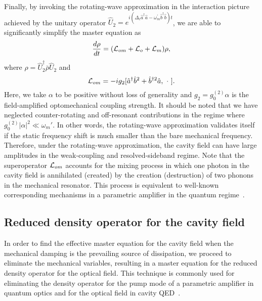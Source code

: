 \documentclass[pra,aps,showpacs,twocolumn,floatfix, superscriptaddress, nofootinbib, nobibnotes]{revtex4-1}
\begin{document}
Finally, by invoking the rotating-wave approximation in the interaction picture achieved by the unitary operator $\hat U_2 = e^{i(\Delta_c\hat a^\dag\hat a-\omega_m^\prime\hat b^\dag\hat b)t}$, we are able to significantly simplify the master equation as
\begin{equation}
\frac{d\rho}{dt} = ({\cal L}_{om}+{\cal L}_o+{\cal L}_m)\rho, \label{master}
\end{equation}
where $\rho = \hat U_2^{\dag}\bar\rho\hat U_2$ and 
\begin{equation}
 {\cal L}_{om} =- ig_2[\hat a^\dag\hat b^2+\hat b^{\dag 2}\hat a,~\cdot~].
\end{equation}
Here, we take $\alpha$ to be positive without loss of generality and $g_2=g_0^{(2)}\alpha$ is the field-amplified optomechanical coupling strength. It should be noted that we have neglected counter-rotating and off-resonant contributions in the regime where $g_0^{(2)}|\alpha|^2 \ll \omega_m'$. In other words, the rotating-wave approximation validates itself if the static frequency shift is much smaller than the bare mechanical frequency. Therefore, under the rotating-wave approximation, the cavity field can have large amplitudes in the weak-coupling and resolved-sideband regime.
Note that the superoperator ${\cal L}_{om}$ accounts for the mixing process in which one photon in the cavity field is annihilated (created) by the creation (destruction) of two phonons in the mechanical resonator. This process is equivalent to well-known corresponding mechanisms in a parametric amplifier in the quantum regime~\cite{Milburn_book_1}.

\subsection{Reduced density operator for the cavity field}
In order to find the effective master equation for the cavity field when the mechanical damping is the prevailing source of dissipation, we proceed to eliminate the mechanical variables, resulting in a master equation for the reduced density operator for the optical field. This technique is commonly used for eliminating the density operator for the pump mode of a parametric amplifier in quantum optics and for the optical field in cavity QED~\cite{Carmichael_book_1, Carmichael_book_2}. 
\end{document}
